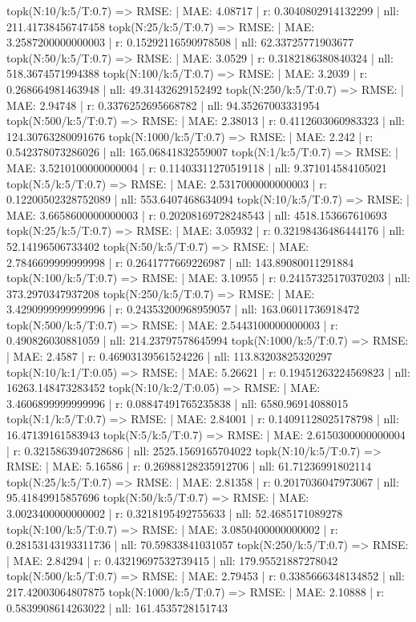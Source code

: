topk(N:10/k:5/T:0.7) => RMSE: | MAE: 4.08717 | r: 0.3040802914132299 | nll: 211.41738456747458
topk(N:25/k:5/T:0.7) => RMSE: | MAE: 3.2587200000000003 | r: 0.15292116590978508 | nll: 62.33725771903677
topk(N:50/k:5/T:0.7) => RMSE: | MAE: 3.0529 | r: 0.3182186380840324 | nll: 518.3674571994388
topk(N:100/k:5/T:0.7) => RMSE: | MAE: 3.2039 | r: 0.268664981463948 | nll: 49.31432629152492
topk(N:250/k:5/T:0.7) => RMSE: | MAE: 2.94748 | r: 0.3376252695668782 | nll: 94.35267003331954
topk(N:500/k:5/T:0.7) => RMSE: | MAE: 2.38013 | r: 0.4112603060983323 | nll: 124.30763280091676
topk(N:1000/k:5/T:0.7) => RMSE: | MAE: 2.242 | r: 0.542378073286026 | nll: 165.06841832559007
topk(N:1/k:5/T:0.7) => RMSE: | MAE: 3.5210100000000004 | r: 0.11403311270519118 | nll: 9.371014584105021
topk(N:5/k:5/T:0.7) => RMSE: | MAE: 2.5317000000000003 | r: 0.12200502328752089 | nll: 553.6407468634094
topk(N:10/k:5/T:0.7) => RMSE: | MAE: 3.6658600000000003 | r: 0.20208169728248543 | nll: 4518.153667610693
topk(N:25/k:5/T:0.7) => RMSE: | MAE: 3.05932 | r: 0.32198436486444176 | nll: 52.14196506733402
topk(N:50/k:5/T:0.7) => RMSE: | MAE: 2.7846699999999998 | r: 0.2641777669226987 | nll: 143.89080011291884
topk(N:100/k:5/T:0.7) => RMSE: | MAE: 3.10955 | r: 0.24157325170370203 | nll: 373.2970347937208
topk(N:250/k:5/T:0.7) => RMSE: | MAE: 3.4290999999999996 | r: 0.24353200968959057 | nll: 163.06011736918472
topk(N:500/k:5/T:0.7) => RMSE: | MAE: 2.5443100000000003 | r: 0.490826030881059 | nll: 214.23797578645994
topk(N:1000/k:5/T:0.7) => RMSE: | MAE: 2.4587 | r: 0.46903139561524226 | nll: 113.83203825320297
topk(N:10/k:1/T:0.05) => RMSE: | MAE: 5.26621 | r: 0.19451263224569823 | nll: 16263.148473283452
topk(N:10/k:2/T:0.05) => RMSE: | MAE: 3.4606899999999996 | r: 0.08847491765235838 | nll: 6580.96914088015
topk(N:1/k:5/T:0.7) => RMSE: | MAE: 2.84001 | r: 0.14091128025178798 | nll: 16.47139161583943
topk(N:5/k:5/T:0.7) => RMSE: | MAE: 2.6150300000000004 | r: 0.3215863940728686 | nll: 2525.1569165704022
topk(N:10/k:5/T:0.7) => RMSE: | MAE: 5.16586 | r: 0.26988128235912706 | nll: 61.71236991802114
topk(N:25/k:5/T:0.7) => RMSE: | MAE: 2.81358 | r: 0.2017036047973067 | nll: 95.41849915857696
topk(N:50/k:5/T:0.7) => RMSE: | MAE: 3.0023400000000002 | r: 0.3218195492755633 | nll: 52.4685171089278
topk(N:100/k:5/T:0.7) => RMSE: | MAE: 3.0850400000000002 | r: 0.28153143193311736 | nll: 70.59833841031057
topk(N:250/k:5/T:0.7) => RMSE: | MAE: 2.84294 | r: 0.43219697532739415 | nll: 179.95521887278042
topk(N:500/k:5/T:0.7) => RMSE: | MAE: 2.79453 | r: 0.3385666348134852 | nll: 217.42003064807875
topk(N:1000/k:5/T:0.7) => RMSE: | MAE: 2.10888 | r: 0.5839908614263022 | nll: 161.4535728151743
